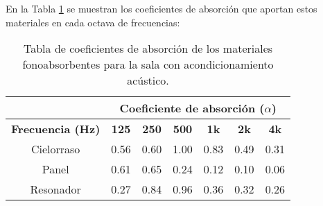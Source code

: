 		En la Tabla \ref{tabla:coeficientes_fonos} se muestran los coeficientes de absorción que aportan estos materiales en cada octava de frecuencias:
		
		\begin{table}[H]
			\centering
			\begin{tabular}{@{}ccccccc@{}}
				 & \multicolumn{6}{c}{\textbf{Coeficiente de absorción ($\alpha$)}}\\ \toprule
				\textbf{Frecuencia (Hz)} & \textbf{125} & \textbf{250} & \textbf{500} & \textbf{1k} & \textbf{2k} & \textbf{4k}   \\ \midrule
					Cielorraso   & 0.56 & 0.60 & 1.00 & 0.83 & 0.49 & 0.31 \\ \midrule
					Panel   & 0.61 & 0.65 & 0.24 & 0.12 & 0.10 & 0.06 \\ \midrule
					Resonador   & 0.27 & 0.84 & 0.96 & 0.36 & 0.32 & 0.26 \\ \bottomrule
			\end{tabular}%
			\caption{Tabla de coeficientes de absorción de los materiales fonoabsorbentes para la sala con acondicionamiento acústico.}
			\label{tabla:coeficientes_fonos}
		\end{table}		

	
		
